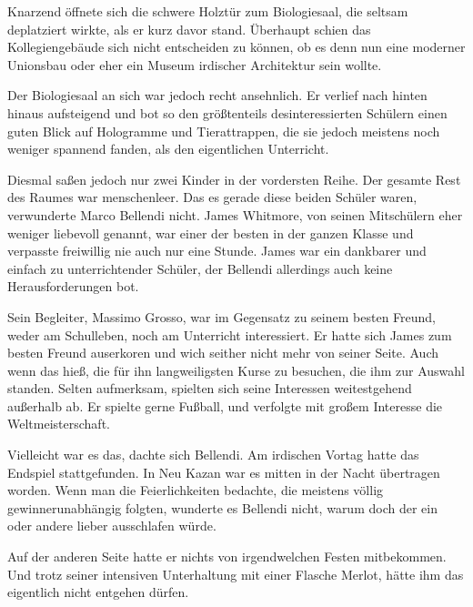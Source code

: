 \par

Knarzend öffnete sich die schwere Holztür zum Biologiesaal, die seltsam deplatziert wirkte, als er kurz davor stand. Überhaupt schien das Kollegiengebäude sich nicht entscheiden zu können, ob es denn nun eine moderner Unionsbau oder eher ein Museum irdischer Architektur sein wollte.

\par

Der Biologiesaal an sich war jedoch recht ansehnlich. Er verlief nach hinten hinaus aufsteigend und bot so den größtenteils desinteressierten Schülern einen guten Blick auf Hologramme und Tierattrappen, die sie jedoch meistens noch weniger spannend fanden, als den eigentlichen Unterricht.

\par

Diesmal saßen jedoch nur zwei Kinder in der vordersten Reihe. Der gesamte Rest des Raumes war menschenleer. Das es gerade diese beiden Schüler waren, verwunderte Marco Bellendi nicht. James Whitmore, von seinen Mitschülern eher weniger liebevoll  genannt, war einer der besten in der ganzen Klasse und verpasste freiwillig nie auch nur eine Stunde. James war ein dankbarer und einfach zu unterrichtender Schüler, der Bellendi allerdings auch keine Herausforderungen bot.

\par

Sein Begleiter, Massimo Grosso, war im Gegensatz zu seinem besten Freund, weder am Schulleben, noch am Unterricht interessiert. Er hatte sich James zum besten Freund auserkoren und wich seither nicht mehr von seiner Seite. Auch wenn das hieß, die für ihn langweiligsten Kurse zu besuchen, die ihm zur Auswahl standen. Selten aufmerksam, spielten sich seine Interessen weitestgehend außerhalb ab. Er spielte gerne Fußball, und verfolgte mit großem Interesse die Weltmeisterschaft.

\par

Vielleicht war es das, dachte sich Bellendi. Am irdischen Vortag hatte das Endspiel stattgefunden. In Neu Kazan war es mitten in der Nacht übertragen worden. Wenn man die Feierlichkeiten bedachte, die meistens völlig gewinnerunabhängig folgten, wunderte es Bellendi nicht, warum doch der ein oder andere lieber ausschlafen würde.

\par

Auf der anderen Seite hatte er nichts von irgendwelchen Festen mitbekommen. Und trotz seiner intensiven Unterhaltung mit einer Flasche Merlot, hätte ihm das eigentlich nicht entgehen dürfen.

